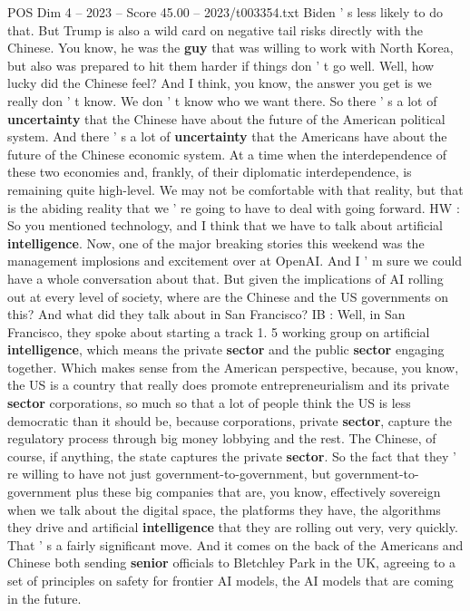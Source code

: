 \begin{textsample}{POS Dim 4 – 2023 – Score 45.00 – 2023/t003354.txt}
Biden ' s less likely to do that.
But Trump is also a wild card on negative tail risks directly with the Chinese.
You know, he was the \textbf{guy} that was willing to work with North Korea, but also was prepared to hit them harder if things don ' t go well.
Well, how lucky did the Chinese feel?
And I think, you know, the answer you get is we really don ' t know.
We don ' t know who we want there.
So there ' s a lot of \textbf{uncertainty} that the Chinese have about the future of the American political system.
And there ' s a lot of \textbf{uncertainty} that the Americans have about the future of the Chinese economic system.
At a time when the interdependence of these two economies and, frankly, of their diplomatic interdependence, is remaining quite high-level.
We may not be comfortable with that reality, but that is the abiding reality that we ' re going to have to deal with going forward.
HW : So you mentioned technology, and I think that we have to talk about artificial \textbf{intelligence}.
Now, one of the major breaking stories this weekend was the management implosions and excitement over at OpenAI.
And I ' m sure we could have a whole conversation about that.
But given the implications of AI rolling out at every level of society, where are the Chinese and the US governments on this?
And what did they talk about in San Francisco?
IB : Well, in San Francisco, they spoke about starting a track 1. 5 working group on artificial \textbf{intelligence}, which means the private \textbf{sector} and the public \textbf{sector} engaging together.
Which makes sense from the American perspective, because, you know, the US is a country that really does promote entrepreneurialism and its private \textbf{sector} corporations, so much so that a lot of people think the US is less democratic than it should be, because corporations, private \textbf{sector}, capture the regulatory process through big money lobbying and the rest.
The Chinese, of course, if anything, the state captures the private \textbf{sector}.
So the fact that they ' re willing to have not just government-to-government, but government-to-government plus these big companies that are, you know, effectively sovereign when we talk about the digital space, the platforms they have, the algorithms they drive and artificial \textbf{intelligence} that they are rolling out very, very quickly.
That ' s a fairly significant move.
And it comes on the back of the Americans and Chinese both sending \textbf{senior} officials to Bletchley Park in the UK, agreeing to a set of principles on safety for frontier AI models, the AI models that are coming in the future.

\end{textsample}

